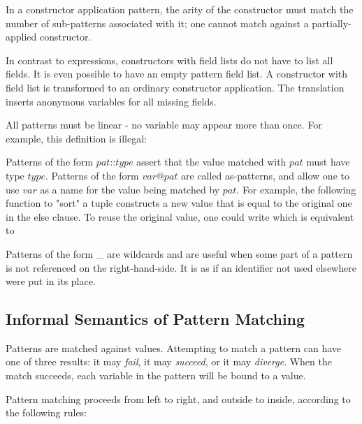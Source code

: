 In a constructor application pattern, the arity of the constructor must match the number of sub-patterns associated with it; one cannot match against a partially-applied constructor.

In contrast to expressions, constructors with field lists do not have to list all fields. It is even possible to have an empty pattern field list. A constructor with field list is transformed to an ordinary constructor application. The translation inserts anonymous variables for all missing fields.

All patterns must be linear - no variable may appear more than once. For example, this definition is illegal:

Patterns of the form $pat$::$type$ assert that the value matched with $pat$ must have type $type$.
Patterns of the form
$var$@$pat$
are called as-patterns, and allow one to use
$var$
as a name for the
value being matched by $pat$. For example, the following function to "sort" a tuple
constructs a new value that is equal to the original one in the else clause. To reuse the original value, one could write
which is equivalent to

Patterns of the form \_ are wildcards and are useful when some part of a pattern is not referenced on
the right-hand-side. It is as if an identifier not used elsewhere were put in its place.

\subsection{Informal Semantics of Pattern Matching}

Patterns are matched against values. Attempting to match a pattern can have one of three results: it may \emph{fail}, it may \emph{succeed}, or it may \emph{diverge}.
When the match succeeds, each variable in the pattern will be bound to a value.

Pattern matching proceeds from left to right, and outside to inside, according to the following rules:

